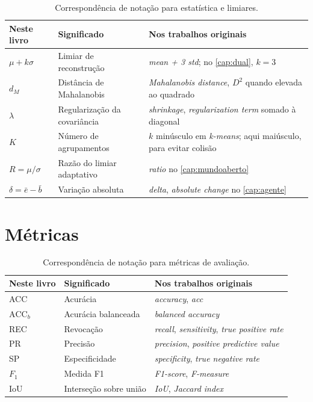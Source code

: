 \begin{table}[htbp]
\centering
\caption{Correspondência de notação para estatística e limiares.}
\label{tab:notb-estat}
\small
\begin{tabular}{p{2.3cm}p{4.6cm}p{5.4cm}}
\toprule
\textbf{Neste livro} & \textbf{Significado} & \textbf{Nos trabalhos originais} \\
\midrule
$\mu + k\sigma$ &
Limiar de reconstrução &
\emph{mean + 3 std}; no \cref{cap:dual}, $k = 3$ \\
\addlinespace
$d_M$ &
Distância de Mahalanobis &
\emph{Mahalanobis distance}, $D^2$ quando elevada ao quadrado \\
\addlinespace
$\lambda$ &
Regularização da covariância &
\emph{shrinkage}, \emph{regularization term} somado à diagonal \\
\addlinespace
$K$ &
Número de agrupamentos &
$k$ minúsculo em \emph{k-means}; aqui maiúsculo, para evitar colisão \\
\addlinespace
$R = \mu/\sigma$ &
Razão do limiar adaptativo &
\emph{ratio} no \cref{cap:mundoaberto} \\
\addlinespace
$\delta = \bar{e} - \bar{b}$ &
Variação absoluta &
\emph{delta}, \emph{absolute change} no \cref{cap:agente} \\
\bottomrule
\end{tabular}
\end{table}

\section{Métricas}

\begin{table}[htbp]
\centering
\caption{Correspondência de notação para métricas de avaliação.}
\label{tab:notb-metricas}
\small
\begin{tabular}{p{2.3cm}p{4.6cm}p{5.4cm}}
\toprule
\textbf{Neste livro} & \textbf{Significado} & \textbf{Nos trabalhos originais} \\
\midrule
ACC & Acurácia & \emph{accuracy}, \emph{acc} \\
$\text{ACC}_b$ & Acurácia balanceada & \emph{balanced accuracy} \\
REC & Revocação & \emph{recall}, \emph{sensitivity}, \emph{true positive rate} \\
PR & Precisão & \emph{precision}, \emph{positive predictive value} \\
SP & Especificidade & \emph{specificity}, \emph{true negative rate} \\
$F_1$ & Medida F1 & \emph{F1-score}, \emph{F-measure} \\
IoU & Interseção sobre união & \emph{IoU}, \emph{Jaccard index} \\
\bottomrule
\end{tabular}
\end{table}

